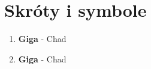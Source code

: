 \section{Skróty i symbole}

 \begin{enumerate}

    \item {\bf Giga } - Chad
    \item {\bf Giga } - Chad
     
 \end{enumerate}